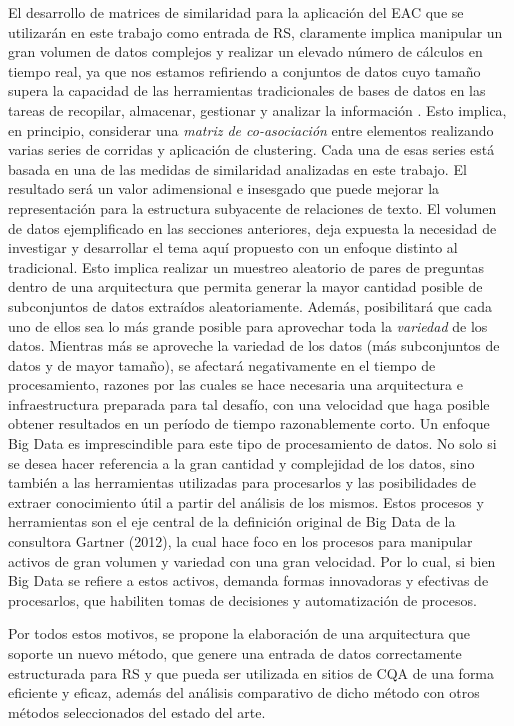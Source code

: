 \bigskip El desarrollo de matrices de similaridad para la aplicación del EAC que se utilizarán en este trabajo como entrada de RS, claramente implica manipular un gran volumen de datos complejos y realizar un elevado número de cálculos en tiempo real, ya que nos estamos refiriendo a conjuntos de datos cuyo tamaño supera la capacidad de las herramientas tradicionales de bases de datos en las tareas de recopilar, almacenar, gestionar y analizar la información \citep{de2016mineria}. Esto implica, en principio, considerar una \textit{matriz de co-asociación} entre elementos realizando varias series de corridas y aplicación de clustering. Cada una de esas series está basada en una de las medidas de similaridad analizadas en este trabajo. El resultado será un valor adimensional e insesgado que puede mejorar la representación para la estructura subyacente de relaciones de texto. El volumen de datos ejemplificado en las secciones anteriores, deja expuesta la necesidad de investigar y desarrollar el tema aquí propuesto con un enfoque distinto al tradicional. Esto implica realizar un muestreo aleatorio de pares de preguntas dentro de una arquitectura que permita generar la mayor cantidad posible de subconjuntos de datos extraídos aleatoriamente. Además, posibilitará que cada uno de ellos sea lo más grande posible para aprovechar toda la \textit{variedad} de los datos. Mientras más se aproveche la variedad de los datos (más subconjuntos de datos y de mayor tamaño), se afectará negativamente en el tiempo de procesamiento, razones por las cuales se hace necesaria una arquitectura e infraestructura preparada para tal desafío, con una velocidad que haga posible obtener resultados en un período de tiempo razonablemente corto. Un enfoque Big Data es imprescindible para este tipo de procesamiento de datos. No solo si se desea hacer referencia a la gran cantidad y complejidad de los datos, sino también a las herramientas utilizadas para procesarlos y las posibilidades de extraer conocimiento útil a partir del análisis de los mismos. Estos procesos y herramientas son el eje central de la definición original de Big Data de la consultora Gartner (2012), la cual hace foco en los procesos para manipular activos de gran volumen y variedad con una gran velocidad. Por lo cual, si bien Big Data se refiere a estos activos, demanda formas innovadoras y efectivas de procesarlos, que habiliten tomas de decisiones y automatización de procesos.

\bigskip Por todos estos motivos, se propone la elaboración de una arquitectura que soporte un nuevo método, que genere una entrada de datos correctamente estructurada para RS y que pueda ser utilizada en sitios de CQA de una forma eficiente y eficaz, además del análisis comparativo de dicho método con otros métodos seleccionados del estado del arte.

